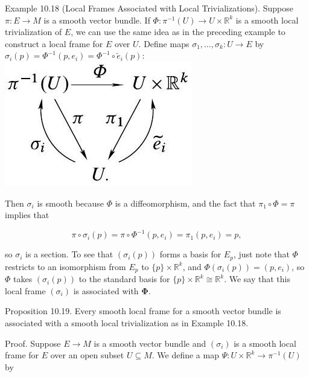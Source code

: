 \documentclass[10pt]{article}
\begin{document}
Example 10.18 (Local Frames Associated with Local Trivializations). Suppose $\pi: E \rightarrow M$ is a smooth vector bundle. If $\Phi: \pi^{-1}(U) \rightarrow U \times \mathbb{R}^{k}$ is a smooth local trivialization of $E$, we can use the same idea as in the preceding example to construct a local frame for $E$ over $U$. Define maps $\sigma_{1}, \ldots, \sigma_{k}: U \rightarrow E$ by $\sigma_{i}(p)=\Phi^{-1}\left(p, e_{i}\right)=\Phi^{-1} \circ \tilde{e}_{i}(p):$\\
\includegraphics[max width=\textwidth, center]{2025_06_03_90f64b1a1e243cccc2e0g-276}

Then $\sigma_{i}$ is smooth because $\Phi$ is a diffeomorphism, and the fact that $\pi_{1} \circ \Phi=\pi$ implies that

$$
\pi \circ \sigma_{i}(p)=\pi \circ \Phi^{-1}\left(p, e_{i}\right)=\pi_{1}\left(p, e_{i}\right)=p,
$$

so $\sigma_{i}$ is a section. To see that $\left(\sigma_{i}(p)\right)$ forms a basis for $E_{p}$, just note that $\Phi$ restricts to an isomorphism from $E_{p}$ to $\{p\} \times \mathbb{R}^{k}$, and $\Phi\left(\sigma_{i}(p)\right)=\left(p, e_{i}\right)$, so $\Phi$ takes $\left(\sigma_{i}(p)\right)$ to the standard basis for $\{p\} \times \mathbb{R}^{k} \cong \mathbb{R}^{k}$. We say that this local frame $\left(\sigma_{i}\right)$ is associated with $\boldsymbol{\Phi}$.

Proposition 10.19. Every smooth local frame for a smooth vector bundle is associated with a smooth local trivialization as in Example 10.18.

Proof. Suppose $E \rightarrow M$ is a smooth vector bundle and $\left(\sigma_{i}\right)$ is a smooth local frame for $E$ over an open subset $U \subseteq M$. We define a map $\Psi: U \times \mathbb{R}^{k} \rightarrow \pi^{-1}(U)$ by
\end{document}

